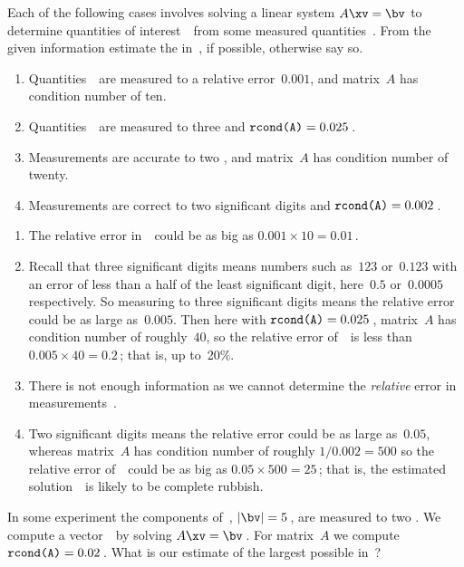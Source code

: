 \begin{example} 
Each of the following cases involves solving a linear system \(A\xv=\bv\) to determine quantities of interest~\xv\ from some measured quantities~\bv.
From the given information estimate the   in~\xv,  if  possible, otherwise say so.
\begin{enumerate}
\item Quantities~\bv\ are measured to a relative error~\(0.001\), and matrix~\(A\) has condition number of ten.
\item Quantities~\bv\ are measured to three  and \(\verb|rcond(A)|=0.025\)\,.
\item Measurements are accurate to two , and matrix~\(A\) has condition number of twenty.
\item  Measurements are correct to two significant digits and \(\verb|rcond(A)|=0.002\)\,.
\end{enumerate}

\begin{solution} 
\begin{enumerate}
\item The relative error in~\xv\ could be as big as \(0.001\times10=0.01\)\,.
\item Recall that three significant digits means numbers such as~\(123\) or~\(0.123\) with an error of less than a half of the least significant digit, here~\(0.5\) or~\(0.0005\) respectively.
So measuring to three significant digits means the relative error could be as large as~\(0.005\).
Then here with \(\verb|rcond(A)|=0.025\)\,, matrix~\(A\) has condition number of roughly~\(40\), so the relative error of~\xv\ is less than \(0.005\times40=0.2\)\,; that is, up to~20\%.
\item There is not enough information as we cannot determine the \emph{relative} error in measurements~\bv.
\item Two significant digits means the relative error could be as large as~\(0.05\), whereas matrix~\(A\) has condition number of roughly \(1/0.002=500\) so the relative error of~\xv\ could be as big as \(0.05\times500=25\)\,; that is, the estimated solution~\xv\ is likely to be complete rubbish.
\end{enumerate}
\end{solution}
\end{example}




\begin{activity}
In some experiment the components of~\bv, \(|\bv|=5\)\,, are measured to two .
We compute a vector~\xv\ by solving \(A\xv=\bv\)\,. 
For matrix~\(A\) we compute \(\verb|rcond(A)|=0.02\)\,.
What is our estimate of the largest possible  in~\xv?
\end{activity}




